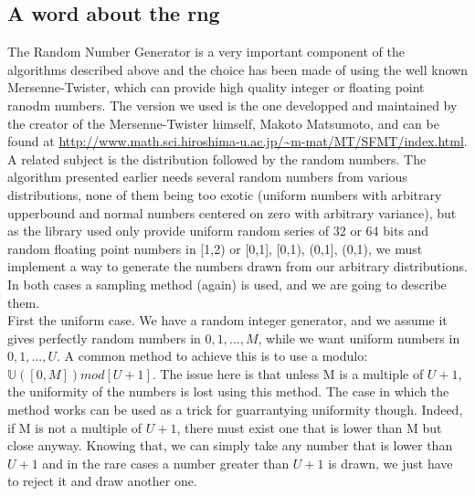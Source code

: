 \documentclass{article}
\begin{document}
	\subsection{A word about the rng}
		The Random Number Generator is a very important component of the algorithms described above and the choice has been made of using the well known Mersenne-Twister, which can provide high quality integer or floating point ranodm numbers. The version we used is the one developped and maintained by the creator of the Mersenne-Twister himself, Makoto Matsumoto, and can be found at \url{http://www.math.sci.hiroshima-u.ac.jp/~m-mat/MT/SFMT/index.html}.\\\indent
		A related subject is the distribution followed by the random numbers. The algorithm presented earlier needs several random numbers from various distributions, none of them being too exotic (uniform numbers with arbitrary upperbound and normal numbers centered on zero with arbitrary variance), but as the library used only provide uniform random series of 32 or 64 bits and random floating point numbers in [1,2) or {[0,1], [0,1), (0,1], (0,1)}, we must implement a way to generate the numbers drawn from our arbitrary distributions. In both cases a sampling method (again) is used, and we are going to describe them.\\\indent
		First the uniform case. We have a random integer generator, and we assume it gives perfectly random numbers in $ {0, 1, ..., M} $, while we want uniform numbers in $ {0, 1, ..., U} $. A common method to achieve this is to use a modulo: $ \mathbb{U}([0, M]) mod[U+1] $. The issue here is that unless M is a multiple of $ U+1 $, the uniformity of the numbers is lost using this method. The case in which the method works can be used as a trick for guarrantying uniformity though. Indeed, if M is not a multiple of $ U+1 $, there must exist one that is lower than M but close anyway. Knowing that, we can simply take any number that is lower than $ U+1 $ and in the rare cases a number greater than $ U+1 $ is drawn, we just have to reject it and draw another one.\\\indent
\end{document}
